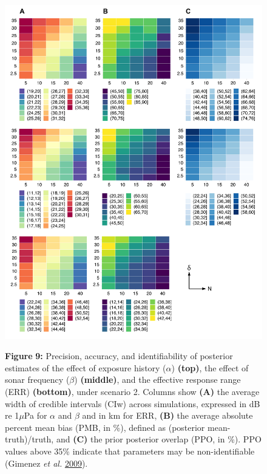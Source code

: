 \documentclass[
]{article}
\begin{document}
\begin{figure}

{\centering \includegraphics[width=0.9\linewidth]{fig/fig_heatplot_S2} 

}

\textbf{Figure }{\textbf{9:} \hypertarget{fig9}{}Precision, accuracy, and identifiability of posterior estimates of the effect of exposure history (\(\alpha\)) \textbf{(top)}, the effect of sonar frequency (\(\beta\)) \textbf{(middle)}, and the effective response range (ERR) \textbf{(bottom)}, under scenario 2. Columns show \textbf{(A)} the average width of credible intervals (CIw) across simulations, expressed in dB re 1\(\mu\)Pa for \(\alpha\) and \(\beta\) and in km for ERR, \textbf{(B)} the average absolute percent mean bias (PMB, in \%), defined as (posterior mean-truth)/truth, and \textbf{(C)} the prior posterior overlap (PPO, in \%). PPO values above 35\% indicate that parameters may be non-identifiable (Gimenez \emph{et al.} \protect\hyperlink{ref-Gimenez2009}{2009}).}\label{fig:unnamed-chunk-8}
\end{figure}
\end{document}
